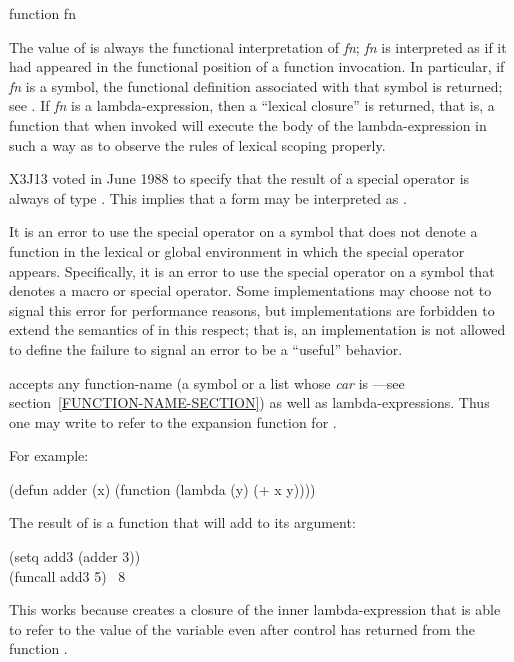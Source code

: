 \begin{defspec}
function fn

The value of  is always the functional interpretation
of \emph{fn}; \emph{fn} is interpreted as if it had appeared
in the functional position of a function invocation.
In particular,
if \emph{fn} is a symbol, the functional definition associated with
that symbol is returned; see .
If \emph{fn} is a lambda-expression, then a
``lexical closure'' is returned, that is, a function that when invoked
will execute the body of the lambda-expression in such a way as to
observe the rules of lexical scoping properly.

\begin{newer}
X3J13 voted in June 1988 
to specify that the result of a  special operator is always
of type .  This implies that a form 
may be interpreted as .

It is an error to use the  special operator on a
    symbol that does not denote a function in the lexical or global environment in
    which the special operator appears.  Specifically, it is an error to use the
     special operator on a symbol that denotes a macro or special operator.
    Some implementations may choose not to signal this error for
        performance reasons, but implementations are forbidden
        to extend the semantics of  in this respect; that is, an
        implementation is not allowed to
        define the failure to signal an error to be a ``useful'' behavior.
\end{newer}

accepts any function-name (a symbol or a list
whose \emph{car} is ---see section~\ref{FUNCTION-NAME-SECTION})
as well as lambda-expressions.
Thus one may write  to refer to the 
expansion function for .

For example:
\begin{lisp}
(defun adder (x) (function (lambda (y) (+ x y))))
\end{lisp}
The result of  is a function that will add  to its
argument:
\begin{lisp}
(setq add3 (adder 3)) \\
(funcall add3 5) \EV\ 8
\end{lisp}
This works because  creates a closure of
the inner lambda-expression that is able to refer to the value 
of the variable  even after control has returned from the
function .


\end{defspec}
